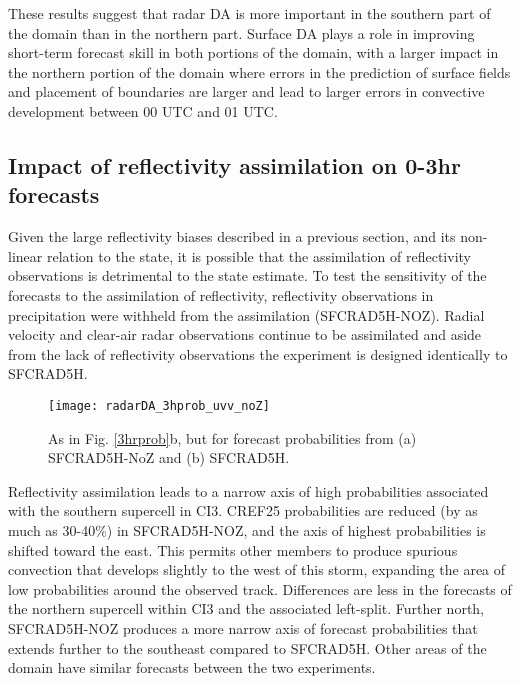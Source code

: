 These results suggest that radar DA is more important in the southern part of the domain than in the northern part. Surface DA plays a role in improving short-term forecast skill in both portions of the domain, with a larger impact in the northern portion of the domain where errors in the prediction of surface fields and placement of boundaries are larger and lead to larger errors in convective development between 00 UTC and 01 UTC.

\subsection{Impact of reflectivity assimilation on 0-3hr forecasts}
\label{section_zassim}
Given the large reflectivity biases described in a previous section, and its non-linear relation to the state, it is possible that the assimilation of reflectivity observations is detrimental to the state estimate. To test the sensitivity of the forecasts to the assimilation of reflectivity, reflectivity observations in precipitation were withheld from the assimilation (SFCRAD5H-NOZ). Radial velocity and clear-air radar observations continue to be assimilated and aside from the lack of reflectivity observations the experiment is designed identically to SFCRAD5H.

\begin{figure}
\centering
\texttt{[image: radarDA\_3hprob\_uvv\_noZ]}
\caption{As in Fig. \ref{3hrprob}b, but for forecast probabilities from (a) SFCRAD5H-NoZ and (b) SFCRAD5H.}
\label{probuvvnoZ}
\end{figure}

Reflectivity assimilation leads to a narrow axis of high probabilities associated with the southern supercell in CI3. CREF25 probabilities are reduced (by as much as 30-40\%) in SFCRAD5H-NOZ, and the axis of highest probabilities is shifted toward the east. This permits other members to produce spurious convection that develops slightly to the west of this storm, expanding the area of low probabilities around the observed track. Differences are less in the forecasts of the northern supercell within CI3 and the associated left-split. Further north, SFCRAD5H-NOZ produces a more narrow axis of forecast probabilities that extends further to the southeast compared to SFCRAD5H. Other areas of the domain have similar forecasts between the two experiments.

